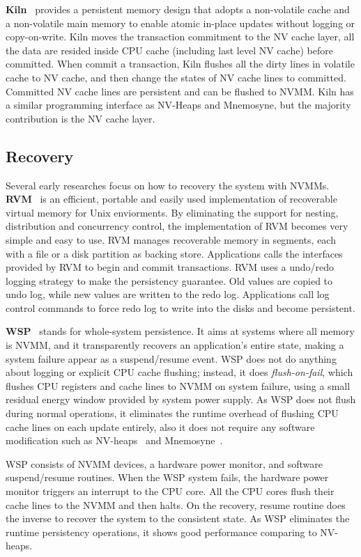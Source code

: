 \textbf{Kiln}~\cite{Kiln} provides a persistent memory design
 that adopts a non-volatile
cache and a non-volatile main memory to enable atomic in-place updates without
logging or copy-on-write. Kiln moves the transaction commitment to the NV
cache layer, all the data are resided inside CPU cache (including last level
NV cache) before committed. When commit a transaction, Kiln flushes all
the dirty lines in volatile cache to NV cache, and then change the states of
NV cache lines to committed. Committed NV cache lines are persistent and
can be flushed to NVMM. Kiln has a similar programming interface as NV-Heaps
and Mnemosyne, but the majority contribution is the NV cache layer.

\subsection{Recovery} 
\label{sec:recovery}

Several early researches focus on how to recovery the system with NVMMs.
\textbf{RVM}~\cite{RVM} is an efficient,
 portable and easily used implementation of
recoverable virtual memory for Unix enviorments. By eliminating the support
for nesting, distribution and concurrency control, the implementation of 
RVM becomes very simple and easy to use. RVM manages recoverable memory in
segments, each with a file or a disk partition as backing store. Applications
calls the interfaces provided by RVM to begin and commit transactions. RVM
uses a undo/redo logging strategy to make the persistency guarantee. Old values
are copied to undo log, while new values are written to the redo log. Applications call log control commands to force redo log to write into the disks
and become persistent.

\textbf{WSP}~\cite{WSP} stands for whole-system persistence.
 It aims at systems where
all memory is NVMM, and it transparently recovers an application's entire state,
making a system failure appear as a suspend/resume event. WSP does not
do anything about logging or explicit CPU cache flushing; instead, it does 
\emph{flush-on-fail}, which flushes CPU registers and cache lines to NVMM
on system failure, using a small residual energy window provided by system
power supply. As WSP does not flush during normal operations, it eliminates
the runtime overhead of flushing CPU cache lines on each update entirely, also
it does not require any software modification such as NV-heaps~\cite{nvheaps}
 and Mnemosyne~\cite{mnemosyne}.

WSP consists of NVMM devices, a hardware power monitor, and software suspend/resume routines. When the WSP system fails, the hardware power monitor triggers
an interrupt to the CPU core. All the CPU cores flush their cache lines to the 
NVMM and then halts. On the recovery, resume routine does the inverse to recover
the system to the consistent state. As WSP eliminates the runtime persistency
operations, it shows good performance comparing to NV-heaps.

